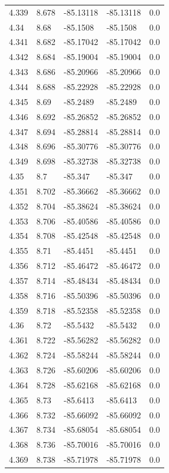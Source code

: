 \begin{tabular}{lllll}
4.339 & 8.678 & -85.13118 & -85.13118 & 0.0 \\
4.34 & 8.68 & -85.1508 & -85.1508 & 0.0 \\
4.341 & 8.682 & -85.17042 & -85.17042 & 0.0 \\
4.342 & 8.684 & -85.19004 & -85.19004 & 0.0 \\
4.343 & 8.686 & -85.20966 & -85.20966 & 0.0 \\
4.344 & 8.688 & -85.22928 & -85.22928 & 0.0 \\
4.345 & 8.69 & -85.2489 & -85.2489 & 0.0 \\
4.346 & 8.692 & -85.26852 & -85.26852 & 0.0 \\
4.347 & 8.694 & -85.28814 & -85.28814 & 0.0 \\
4.348 & 8.696 & -85.30776 & -85.30776 & 0.0 \\
4.349 & 8.698 & -85.32738 & -85.32738 & 0.0 \\
4.35 & 8.7 & -85.347 & -85.347 & 0.0 \\
4.351 & 8.702 & -85.36662 & -85.36662 & 0.0 \\
4.352 & 8.704 & -85.38624 & -85.38624 & 0.0 \\
4.353 & 8.706 & -85.40586 & -85.40586 & 0.0 \\
4.354 & 8.708 & -85.42548 & -85.42548 & 0.0 \\
4.355 & 8.71 & -85.4451 & -85.4451 & 0.0 \\
4.356 & 8.712 & -85.46472 & -85.46472 & 0.0 \\
4.357 & 8.714 & -85.48434 & -85.48434 & 0.0 \\
4.358 & 8.716 & -85.50396 & -85.50396 & 0.0 \\
4.359 & 8.718 & -85.52358 & -85.52358 & 0.0 \\
4.36 & 8.72 & -85.5432 & -85.5432 & 0.0 \\
4.361 & 8.722 & -85.56282 & -85.56282 & 0.0 \\
4.362 & 8.724 & -85.58244 & -85.58244 & 0.0 \\
4.363 & 8.726 & -85.60206 & -85.60206 & 0.0 \\
4.364 & 8.728 & -85.62168 & -85.62168 & 0.0 \\
4.365 & 8.73 & -85.6413 & -85.6413 & 0.0 \\
4.366 & 8.732 & -85.66092 & -85.66092 & 0.0 \\
4.367 & 8.734 & -85.68054 & -85.68054 & 0.0 \\
4.368 & 8.736 & -85.70016 & -85.70016 & 0.0 \\
4.369 & 8.738 & -85.71978 & -85.71978 & 0.0 \\

\end{tabular}
